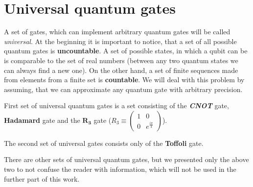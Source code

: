 \section{Universal quantum gates} \label{elementary_quantum_gates}

A set of gates, which can implement arbitrary quantum gates will be called \textit{universal}. At the beginning it is important to notice, that a set of all possible quantum gates is \textbf{uncountable}. A set of possible states, in which a qubit can be is comparable to the set of real numbers (between any two quantum states we can always find a new one). On the other hand, a set of finite sequences made from elements from a finite set is \textbf{countable}. We will deal with this problem by assuming, that we can approximate any quantum gate with arbitrary precision.

First set of universal quantum gates is a set consisting of the \textbf{\textit{CNOT}} gate, \textbf{Hadamard} gate and the $\mathbf{R_3}$ gate ($R_3 \equiv \begin{pmatrix} 1 & 0 \\ 0 & e^{\frac{i \pi}{4}}\end{pmatrix}$).

The second set of universal gates consists only of the \textbf{Toffoli} gate.

There are other sets of universal quantum gates, but we presented only the above two to not confuse the reader with information, which will not be used in the further part of this work.